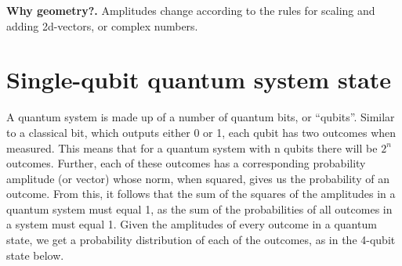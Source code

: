 \documentclass[11pt, letterpaper]{article}
\renewcommand{\myboldhead}[1]{\vspace{.1in}\hspace{-.14in}\textbf{#1.}}
\begin{document}
\myboldhead{Why geometry?}
Amplitudes change according to the rules for scaling and adding 2d-vectors, or complex numbers.


\section{Single-qubit quantum system state}
\label{sec:state}

A quantum system is made up of a number of quantum bits, or “qubits”. Similar to a classical bit, which outputs either 0 or 1, each qubit has two outcomes when measured. This means that for a quantum system with n qubits there will be $2^n$ outcomes. Further, each of these outcomes has a corresponding probability amplitude (or vector) whose norm, when squared, gives us the probability of an outcome. From this, it follows that the sum of the squares of the amplitudes in a quantum system must equal 1, as the sum of the probabilities of all outcomes in a system must equal 1. Given the amplitudes of every outcome in a quantum state, we get a probability distribution of each of the outcomes, as in the 4-qubit state below.
\end{document}
